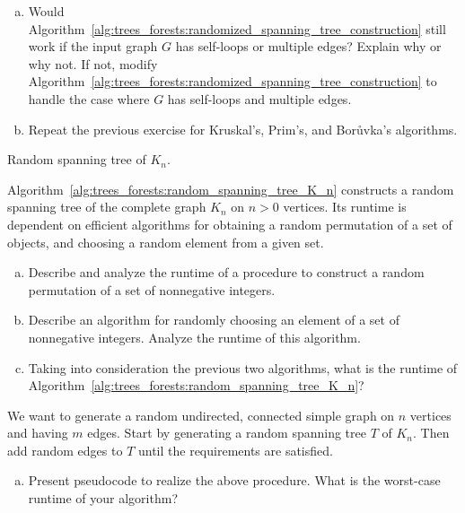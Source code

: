 \begin{problem}
\begin{enumerate}[(a)]
  \item Would
    Algorithm~\ref{alg:trees_forests:randomized_spanning_tree_construction}
    still work if the input graph $G$ has self-loops or multiple
    edges? Explain why or why not. If not, modify
    Algorithm~\ref{alg:trees_forests:randomized_spanning_tree_construction}
    to handle the case where $G$ has self-loops and multiple edges.

  \item Repeat the previous exercise for
    Kruskal's,
    Prim's, and
    Bor\r{u}vka's algorithms.
  \end{enumerate}

\begin{algorithm}[!htbp]

\caption{Random spanning tree of $K_n$.}
\label{alg:trees_forests:random_spanning_tree_K_n}
\end{algorithm}

\item Algorithm~\ref{alg:trees_forests:random_spanning_tree_K_n}
  constructs a random spanning tree of the complete graph $K_n$ on
  $n > 0$ vertices. Its runtime is dependent on efficient algorithms
  for obtaining a random permutation of a set of objects, and choosing
  a random element from a given set.
  \begin{enumerate}[(a)]
  \item Describe and analyze the runtime of a procedure to construct a
    random permutation of a set of
    nonnegative integers.

  \item Describe an algorithm for randomly choosing an element of a
    set of nonnegative integers. Analyze the runtime of this
    algorithm.

  \item Taking into consideration the previous two algorithms, what is
    the runtime of
    Algorithm~\ref{alg:trees_forests:random_spanning_tree_K_n}?
  \end{enumerate}

\item We want to generate a random undirected,
  connected simple graph on $n$ vertices and
  having $m$ edges. Start by generating a random
  spanning tree $T$ of
  $K_n$. Then add random edges to $T$ until the
  requirements are satisfied.
  \begin{enumerate}[(a)]
  \item Present pseudocode to realize the above procedure. What is the
    worst-case runtime of your algorithm?


\end{enumerate}
\end{problem}
